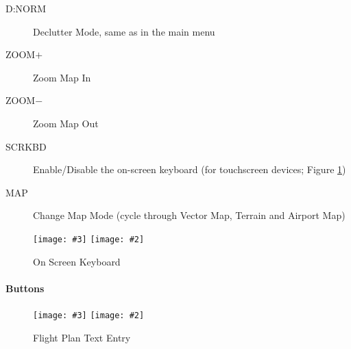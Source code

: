\documentclass[a4paper,10pt,pdftex]{article}
\newcommand{\jnxfig}[3][]{\ifmypdf\texttt{[image: \#3]}
  \else\texttt{[image: \#2]}\fi}
\begin{document}
\begin{description}
\item[D:NORM] Declutter Mode, same as in the main menu
\item[ZOOM$+$] Zoom Map In
\item[ZOOM$-$] Zoom Map Out
\item[SCRKBD] Enable/Disable the on-screen keyboard (for touchscreen
  devices; Figure \ref{fig:screenkbd})
\item[MAP] Change Map Mode (cycle through Vector Map, Terrain and
  Airport Map)
\end{description}

\begin{figure}[!htbp]
  \begin{center}
    \jnxfig[scale=0.5]{screenkbd.eps}{screenkbd.png}
    \caption{On Screen Keyboard}
    \label{fig:screenkbd}
  \end{center}
\end{figure}

\paragraph{Buttons}

\begin{figure}[!htbp]
  \begin{center}
    \jnxfig[scale=0.5]{fpltextentry.eps}{fpltextentry.png}
    \caption{Flight Plan Text Entry}
    \label{fig:fpltextentry}
  \end{center}
\end{figure}
\end{document}
